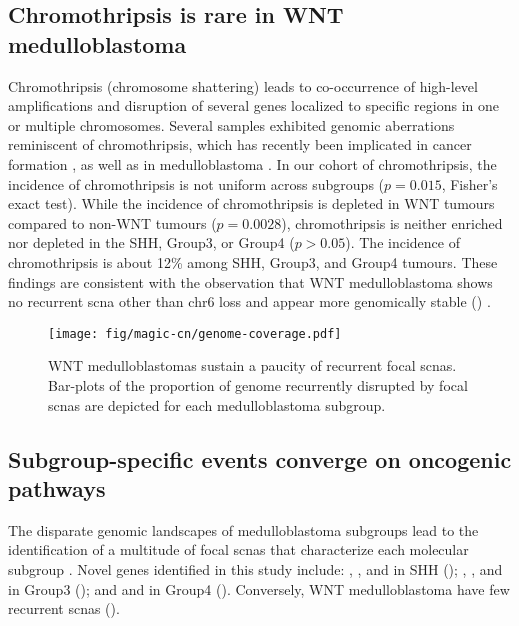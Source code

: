 \subsection{Chromothripsis is rare in WNT medulloblastoma}

Chromothripsis (chromosome shattering) leads to co-occurrence of high-level amplifications and disruption of several genes localized to specific regions in one or multiple chromosomes. Several samples exhibited genomic aberrations reminiscent of chromothripsis, which has recently been implicated in cancer formation , as well as in medulloblastoma . In our cohort of chromothripsis, the incidence of chromothripsis is not uniform across subgroups ($p = 0.015$, Fisher's exact test). While the incidence of chromothripsis is depleted in WNT tumours compared to non-WNT tumours ($p = 0.0028$), chromothripsis is neither enriched nor depleted in the SHH, Group3, or Group4 ($p > 0.05$). The incidence of chromothripsis is about 12\% among SHH, Group3, and Group4 tumours. These findings are consistent with the observation that WNT medulloblastoma shows no recurrent \gls{scna} other than chr6 loss and appear more genomically stable () .

\begin{SCfigure}[5]
	\centering
	\texttt{[image: fig/magic-cn/genome-coverage.pdf]}
	\caption[WNT medulloblastomas sustain a paucity of recurrent focal \gls{scnas}.]
	{
		WNT medulloblastomas sustain a paucity of recurrent focal \gls{scnas}.
		Bar-plots of the proportion of genome recurrently disrupted by focal \gls{scnas} are depicted for each medulloblastoma subgroup.
	}
	\label{fig:genome-coverage}
\end{SCfigure}

\subsection{Subgroup-specific events converge on oncogenic pathways}

The disparate genomic landscapes of medulloblastoma subgroups lead to the identification of a multitude of focal \gls{scnas} that characterize each molecular subgroup . Novel genes identified in this study include: , , and  in SHH (); , , and  in Group3 (); and  and  in Group4 (). Conversely, WNT medulloblastoma have few recurrent \gls{scnas} (). 

